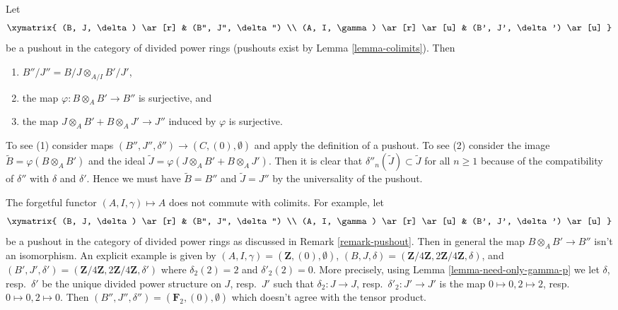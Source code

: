 \begin{remark}
\label{remark-pushout}
Let
$$
\xymatrix{
(B, J, \delta) \ar[r] & (B'', J'', \delta'') \\
(A, I, \gamma) \ar[r] \ar[u] & (B', J', \delta') \ar[u]
}
$$
be a pushout in the category of divided power rings (pushouts exist
by Lemma \ref{lemma-colimits}). Then
\begin{enumerate}
\item $B''/J'' = B/J \otimes_{A/I} B'/J'$,
\item the map $\varphi : B \otimes_A B' \to B''$ is surjective, and
\item the map $J \otimes_A B' + B \otimes_A J' \to J''$ induced by $\varphi$
is surjective.
\end{enumerate}
To see (1) consider maps $(B'', J'', \delta'') \to (C, (0), \emptyset)$
and apply the definition of a pushout. To see (2) consider the
image $\tilde B = \varphi(B \otimes_A B')$ and the ideal
$\tilde J = \varphi(J \otimes_A B' + B \otimes_A J')$. Then it is
clear that $\delta''_n(\tilde J) \subset \tilde J$ for all $n \geq 1$
because of the compatibility of $\delta''$ with $\delta$ and $\delta'$.
Hence we must have $\tilde B = B''$ and $\tilde J = J''$ by the universality
of the pushout.
\end{remark}

\begin{remark}
\label{remark-forgetful}
The forgetful functor $(A, I, \gamma) \mapsto A$ does not commute with
colimits. For example, let
$$
\xymatrix{
(B, J, \delta) \ar[r] & (B'', J'', \delta'') \\
(A, I, \gamma) \ar[r] \ar[u] & (B', J', \delta') \ar[u]
}
$$
be a pushout in the category of divided power rings as discussed
in Remark \ref{remark-pushout}. Then in general the map
$B \otimes_A B' \to B''$ isn't an isomorphism.
An explicit example is given by
$(A, I, \gamma) = (\mathbf{Z}, (0), \emptyset)$,
$(B, J, \delta) = (\mathbf{Z}/4\mathbf{Z}, 2\mathbf{Z}/4\mathbf{Z}, \delta)$,
and
$(B', J', \delta') =
(\mathbf{Z}/4\mathbf{Z}, 2\mathbf{Z}/4\mathbf{Z}, \delta')$
where $\delta_2(2) = 2$ and $\delta'_2(2) = 0$.
More precisely, using Lemma \ref{lemma-need-only-gamma-p}
we let $\delta$, resp.\ $\delta'$ be the unique
divided power structure on $J$, resp.\ $J'$ such that
$\delta_2 : J \to J$, resp.\ $\delta'_2 : J' \to J'$
is the map $0 \mapsto 0, 2 \mapsto 2$, resp.\ $0 \mapsto 0, 2 \mapsto 0$.
Then $(B'', J'', \delta'') = (\mathbf{F}_2, (0), \emptyset)$
which doesn't agree with the tensor product.
\end{remark}


